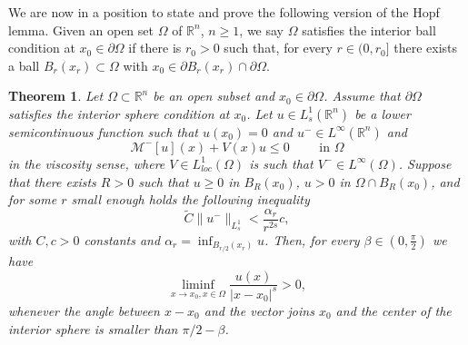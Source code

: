 \documentclass[11pt]{article}
\newcommand{\R}{\mathbb{R}}
\newtheorem{theorem}{Theorem}
\begin{document}
We are now in a position to state and prove the following version of the Hopf lemma. 
Given an open set $\Omega$ of $\mathbb{R}^{n}$, $n \geq 1$, we say $\Omega$ satisfies the interior ball condition at $x_{0}\in\partial\Omega$ if there is $r_{0}>0$ such that, for every $r\in(0,r_{0}]$ there exists a ball $B_{r}(x_{r})\subset \Omega$ with $x_{0} \in \partial B_{r}(x_{r})\cap\partial\Omega$.

\begin{theorem}\label{thm1}
    Let $\Omega \subset \mathbb{R}^{n}$ be an open subset and $x_{0}\in\partial\Omega$. Assume that $\partial\Omega$ satisfies the interior sphere condition at $x_0$. 
Let $u\in L_{s}^{1}(\R^n)$ be a lower semicontinuous function such that $u(x_{0})=0$ and $u^{-}\in L^{\infty}(\mathbb{R}^{n})$ and 
    \begin{equation*}
        \mathcal{M}^{-}[u](x) + V(x)u \leq 0 \qquad\text{ in }\Omega
    \end{equation*}
    in the viscosity sense, where $V\in L^{1}_{loc}(\Omega)$ is such that $V^{-}\in L^{\infty}(\Omega)$.
    Suppose that there exists $R>0$ such that $u\geq 0$ in $B_{R}(x_{0})$, $u>0$ in $\Omega\cap B_{R}(x_{0})$, and for some \(r\) small enough holds the following inequality
    \begin{equation}\label{inequalityhopf}
        \widetilde{C}\|u^{-}\|_{L^{1}_{s}} < \dfrac{\alpha_r}{r^{2s}}c,
    \end{equation}
    with \(C,c>0\) constants and \(\alpha_r = \inf_{B_{r/2}(x_r)}u\). Then, for every $\beta\in \left(0,\frac{\pi}{2}\right)$ we have 
    \begin{equation}\label{hopfslemma}
        \liminf_{x\to x_0, x\in\Omega}\frac{u(x)}{|x-x_{0}|^{s}}>0,
    \end{equation}
    whenever the angle between $x-x_0$ and the vector joins $x_0$ and the center of the interior sphere is smaller than $\pi/2-\beta$.
\end{theorem}
\end{document}
